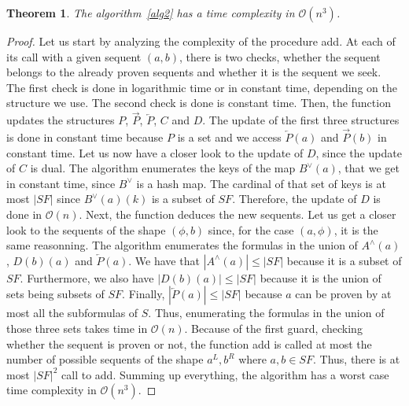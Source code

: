 \documentclass[a4paper, 11pt]{article}
\newtheorem{theorem}{Theorem}
\begin{document}
    \begin{theorem}
	    The algorithm~\ref{alg2} has a time complexity in $\mathcal{O}(n^3)$.
    \end{theorem}
    \begin{proof}
	    Let us start by analyzing the complexity of the procedure \textsf{add}. At each of its call
	    with a given sequent $(a,b)$, there is two checks, whether the sequent belongs to the already
	    proven sequents and whether it is the sequent we seek. The first check is done in logarithmic
	    time or in constant time, depending on the structure we use. The second check is done
	    is constant time. Then, the function updates the structures $P$, $\overrightarrow{P}$,
	    $\overleftarrow{P}$, $C$ and $D$. The update of the first three structures is done in 
	    constant time because $P$ is a set and we access $\overleftarrow{P}(a)$ and 
	    $\overrightarrow{P}(b)$ in constant time. Let us now have a closer look to the update of 
	    $D$, since the update of $C$ is dual. The algorithm enumerates the keys of the map 
	    $B^\vee(a)$, that we get in constant time, since $B^\vee$ is a hash map. The cardinal of 
	    that set of keys is at most
	    $|SF|$ since $B^\vee(a)(k)$ is a subset of $SF$. Therefore, the update of $D$ is done in
	    $\mathcal{O}(n)$. Next, the function deduces the new sequents. Let us get a closer look
	    to the sequents of the shape $(\phi,b)$ since, for the case $(a,\phi)$, it is the same
	    reasonning. The algorithm enumerates the formulas in the union of $A^\wedge(a)$, $D(b)(a)$
	    and $\overleftarrow{P}(a)$. We have that $|A^\wedge(a)|\leq|SF|$ because it is a subset
	    of $SF$. Furthermore, we also have $|D(b)(a)|\leq|SF|$ because it is the union of sets 
	    being subsets of $SF$. Finally, $|\overleftarrow{P}(a)|\leq|SF|$ because $a$ can be proven
	    by at most all the subformulas of $S$. Thus, enumerating the formulas in the union of those
	    three sets takes time in $\mathcal{O}(n)$. Because of the first guard, checking whether the
	    sequent is proven or not, the function \textsf{add} is called at most the number of possible 
	    sequents of the shape $a^L,b^R$ where $a,b\in SF$. Thus, there is at most $|SF|^2$ call to 
	    \textsf{add}. Summing up everything, the algorithm has a worst case time complexity in
	    $\mathcal{O}(n^3)$.


\end{proof}
\end{document}
